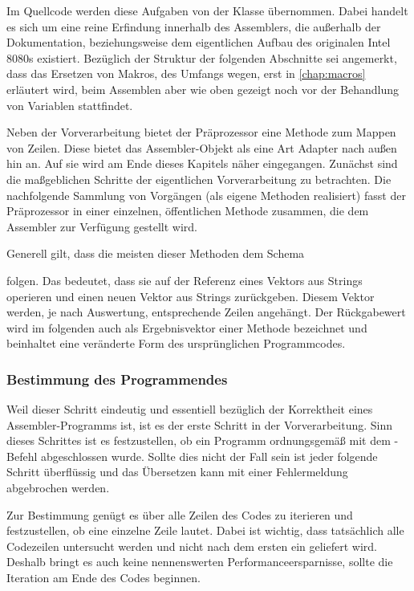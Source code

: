 Im Quellcode werden diese Aufgaben von der Klasse  übernommen. Dabei handelt es sich um eine reine Erfindung innerhalb des Assemblers, die außerhalb der Dokumentation, beziehungsweise dem eigentlichen Aufbau des originalen Intel 8080s existiert. Bezüglich der Struktur der folgenden Abschnitte sei angemerkt, dass das Ersetzen von Makros, des Umfangs wegen, erst in \ref{chap:macros} erläutert wird, beim Assemblen aber wie oben gezeigt noch vor der Behandlung von Variablen stattfindet.

Neben der Vorverarbeitung bietet der \glqq Präprozessor\grqq{} eine Methode zum Mappen von Zeilen. Diese bietet das Assembler-Objekt als eine Art Adapter nach außen hin an. Auf sie wird am Ende dieses Kapitels näher eingegangen. Zunächst sind die maßgeblichen Schritte der eigentlichen Vorverarbeitung zu betrachten. Die nachfolgende Sammlung von Vorgängen (als eigene Methoden realisiert) fasst der Präprozessor in einer einzelnen, öffentlichen Methode  zusammen, die dem Assembler zur Verfügung gestellt wird.

Generell gilt, dass die meisten dieser Methoden dem Schema


 folgen. Das bedeutet, dass sie auf der Referenz eines Vektors aus Strings operieren und einen neuen Vektor aus Strings zurückgeben. Diesem Vektor werden, je nach Auswertung, entsprechende Zeilen angehängt. Der Rückgabewert wird im folgenden auch als \glqq Ergebnisvektor\grqq{} einer Methode bezeichnet und beinhaltet eine veränderte Form des ursprünglichen Programmcodes.

\subsubsection{Bestimmung des Programmendes}

Weil dieser Schritt eindeutig und essentiell bezüglich der Korrektheit eines Assembler-Programms ist, ist es der erste Schritt in der Vorverarbeitung. Sinn dieses Schrittes ist es festzustellen, ob ein Programm ordnungsgemäß mit dem -Befehl abgeschlossen wurde. Sollte dies nicht der Fall sein ist jeder folgende Schritt überflüssig und das Übersetzen kann mit einer Fehlermeldung abgebrochen werden.

Zur Bestimmung genügt es über alle Zeilen des Codes zu iterieren und festzustellen, ob eine einzelne Zeile  lautet. Dabei ist wichtig, dass tatsächlich alle Codezeilen untersucht werden und nicht nach dem ersten  ein  geliefert wird. Deshalb bringt es auch keine nennenswerten Performanceersparnisse, sollte die Iteration am Ende des Codes beginnen. 

